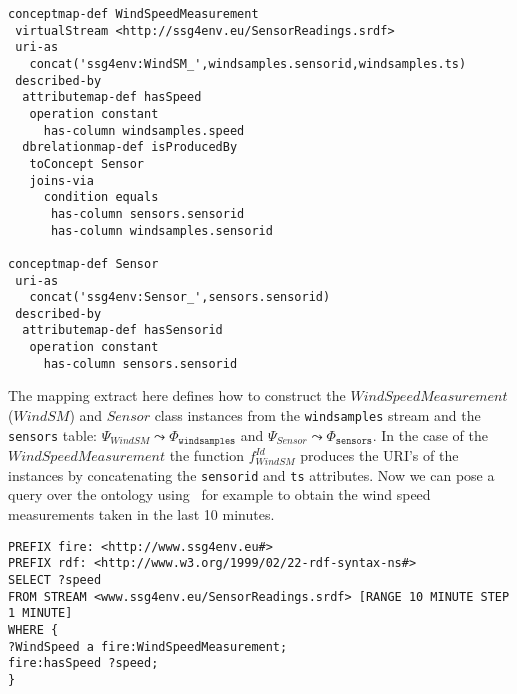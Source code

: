 \begin{lstlisting}[style=R2OStyle,language=R2O,frame=none]
conceptmap-def WindSpeedMeasurement
 virtualStream <http://ssg4env.eu/SensorReadings.srdf>
 uri-as
   concat('ssg4env:WindSM_',windsamples.sensorid,windsamples.ts)
 described-by
  attributemap-def hasSpeed
   operation constant
     has-column windsamples.speed
  dbrelationmap-def isProducedBy
   toConcept Sensor
   joins-via
     condition equals
      has-column sensors.sensorid
      has-column windsamples.sensorid

conceptmap-def Sensor
 uri-as
   concat('ssg4env:Sensor_',sensors.sensorid)
 described-by
  attributemap-def hasSensorid
   operation constant
     has-column sensors.sensorid
\end{lstlisting}
%
The mapping extract here defines how to construct the $WindSpeedMeasurement$ ($WindSM$) and $Sensor$ class instances from the \texttt{windsamples} stream and the \texttt{sensors} table: $\Psi_{WindSM}\leadsto \Phi_{\mathtt{windsamples}}$ and $\Psi_{Sensor}\leadsto \Phi_{\mathtt{sensors}}$. In the case of the $WindSpeedMeasurement$ the function $f_{WindSM}^{Id}$ produces the URI's of the instances by concatenating the \texttt{sensorid} and \texttt{ts} attributes.
Now we can pose a query over the ontology using \sparqlstr\, for example to obtain the wind speed measurements taken in the last 10 minutes.
\begin{lstlisting}[style=SPARQLSTRStyle,language=SPARQLSTR,frame=none]
PREFIX fire: <http://www.ssg4env.eu#>
PREFIX rdf: <http://www.w3.org/1999/02/22-rdf-syntax-ns#>
SELECT ?speed
FROM STREAM <www.ssg4env.eu/SensorReadings.srdf> [RANGE 10 MINUTE STEP 1 MINUTE]
WHERE {
?WindSpeed a fire:WindSpeedMeasurement;
fire:hasSpeed ?speed;
}
\end{lstlisting}

